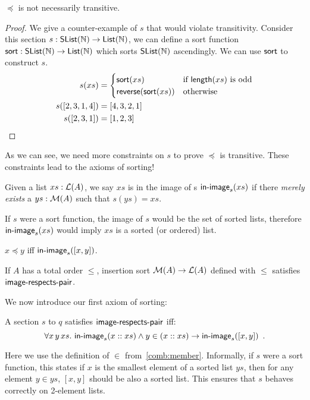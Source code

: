 \begin{proposition}
    $\preccurlyeq$ is not necessarily transitive.
\end{proposition}
\begin{proof}
    We give a counter-example of $s$ that would violate transitivity.
    Consider this section $s : \operatorname{\mathsf{SList}}(\mathbb{N}) \to \operatorname{\mathsf{List}}(\mathbb{N})$, we can define a sort function
    $\operatorname{\mathsf{sort}} : \operatorname{\mathsf{SList}}(\mathbb{N}) \to \operatorname{\mathsf{List}}(\mathbb{N})$ which sorts $\operatorname{\mathsf{SList}}(\mathbb{N})$ ascendingly. We can use $\operatorname{\mathsf{sort}}$
    to construct $s$.
    \begin{align*}
        s(xs)        & = \begin{cases}
                             \operatorname{\mathsf{sort}}(xs)                 & \text{if $\operatorname{\mathsf{length}}(xs)$ is odd} \\
                             \operatorname{\mathsf{reverse}}(\operatorname{\mathsf{sort}}(xs)) & \text{otherwise}
                         \end{cases} \\
        s([2,3,1,4]) & = [4,3,2,1]                                                                     \\
        s([2,3,1])   & = [1,2,3]
    \end{align*}
\end{proof}
As we can see, we need more constraints on $s$ to prove $\preccurlyeq$ is transitive.
These constraints lead to the axioms of sorting!
\begin{definition}
    Given a list $xs : \mathcal{L}(A)$, we say $xs$ is in the image of s $\operatorname{\mathsf{in-image}}_s(xs)$ if there \emph{merely exists}
    a $ys : \mathcal{M}(A)$ such that $s(ys) = xs$.
\end{definition}

If $s$ were a sort function, the image of $s$ would be the set of sorted lists, therefore
$\operatorname{\mathsf{in-image}}_s(xs)$ would imply $xs$ is a sorted (or ordered) list.

\begin{proposition}\label{sort:sort-to-order}
    $x \preccurlyeq y$ \; iff \; $\operatorname{\mathsf{in-image}}_s([x, y])$.
\end{proposition}

\begin{proposition}
    If $A$ has a total order $\leq$, insertion sort $\mathcal{M}(A) \to \mathcal{L}(A)$ defined with $\leq$
    satisfies $\operatorname{\mathsf{image-respects-pair}}$.
\end{proposition}

\noindent
We now introduce our first axiom of sorting:
\begin{definition}\label{sort:head-least}
    A section $s$ to $q$ satisfies $\operatorname{\mathsf{image-respects-pair}}$ iff:
    \[
        \forall x\, y\, xs.\, \operatorname{\mathsf{in-image}}_s(x :: xs) \land y \in (x :: xs) \to \operatorname{\mathsf{in-image}}_s([x,y])
        \enspace .
    \]
\end{definition}
Here we use the definition of $\in$ from~\cref{comb:member}. Informally,
if $s$ were a sort function, this states if
$x$ is the smallest element of a sorted list $ys$, then for any element $y \in ys$,
$[x, y]$ should be also a sorted list.
%
This ensures that $s$ behaves correctly on 2-element lists.

